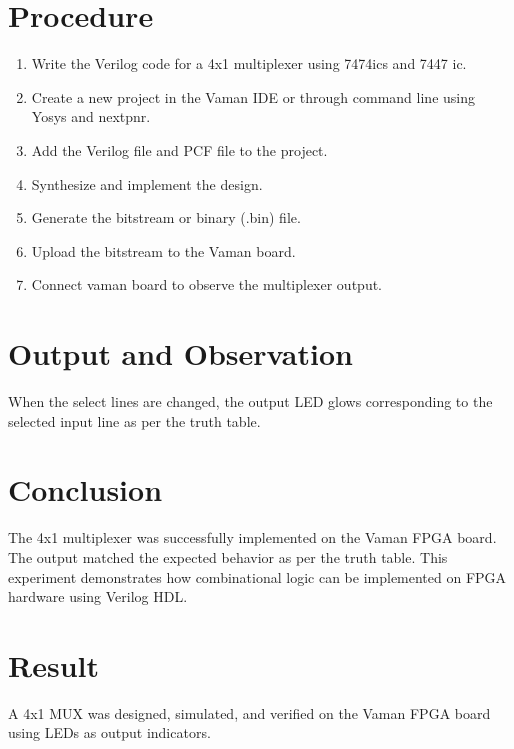 \documentclass[a4paper,12pt]{article}
\begin{document}
\section*{Procedure}
\begin{enumerate}
    \item Write the Verilog code for a 4x1 multiplexer using 7474ics and 7447 ic.
    \item Create a new project in the Vaman IDE or through command line using Yosys and nextpnr.
    \item Add the Verilog file and PCF file to the project.
    \item Synthesize and implement the design.
    \item Generate the bitstream or binary (.bin) file.
    \item Upload the bitstream to the Vaman board.
    \item Connect vaman board to observe the multiplexer output.
\end{enumerate}

\section*{Output and Observation}
When the select lines are changed, the output LED glows corresponding to the selected input line as per the truth table.

\section*{Conclusion}
The 4x1 multiplexer was successfully implemented on the Vaman FPGA board. The output matched the expected behavior as per the truth table. This experiment demonstrates how combinational logic can be implemented on FPGA hardware using Verilog HDL.

\section*{Result}
A 4x1 MUX was designed, simulated, and verified on the Vaman FPGA board using LEDs as output indicators.
\end{document}
